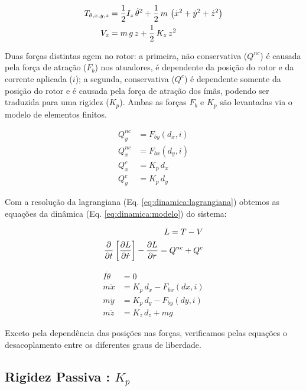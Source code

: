  \begin{align}
 	T_{\theta, x, y, z} &= \frac{1}{2} I_z \, \dot{\theta}^2 + \frac{1}{2} \, m \, \left( \dot{x}^2 + \dot{y}^2 + \dot{z}^2 \right) \notag \\
 	V_z &= m \, g \, z + \frac{1}{2} \, K_z \, z^2
 \end{align}	
 	
 Duas forças distintas agem no rotor: a primeira, não conservativa ($Q^{nc}$) é causada pela força de atração ($F_b$) nos atuadores, é dependente da posição do rotor e da corrente aplicada ($i$); a segunda, conservativa ($Q^{c}$) é dependente somente da posição do rotor e é causada pela força de atração dos ímãs, podendo ser traduzida para uma rigidez ($K_p$). Ambas as forças $F_b$ e $K_p$ são levantadas via o modelo de elementos finitos. 
	 	
 \begin{align}
 	Q_y^{nc} &= F_{by}(d_x,i)  \\
 	Q_x^{nc} &= F_{bx}(d_y,i)  \\
 	Q^{c}_x  &= K_p \, d_x \\
 	Q^{c}_y  &= K_p \, d_y 
 \end{align}
 		
  
  Com a resolução da lagrangiana (Eq. \ref{eq:dinamica:lagrangiana}) obtemos as equações da dinâmica (Eq. \ref{eq:dinamica:modelo}) do sistema:
  
   \begin{align}
   		L = T - V \notag \\
   		\frac{\partial}{\partial t} \left[ \frac{\partial L}{\partial \dot{r}} \right] -  \frac{\partial L}{\partial r} = Q^{nc} + Q^{c}
   		\label{eq:dinamica:lagrangiana}
   \end{align}
  
 	\begin{align}
 	I \ddot{\theta} &= 0 \\
 	m \ddot{x}		&= K_p \, d_x  - F_{bx}(dx,i) \\
 	m \ddot{y}		&= K_p \, d_y  - F_{by}(dy,i) \label{eq:dinamica:rotor:radial}\\	
 	m \ddot{z}  	&= K_z \, d_z + m g 
 	\label{eq:dinamica:modelo}
 	\end{align}	
 
 Exceto pela dependência das posições nas forças, verificamos pelas equações o desacoplamento entre os diferentes graus de liberdade. 

\subsection{Rigidez Passiva : $K_p$}

